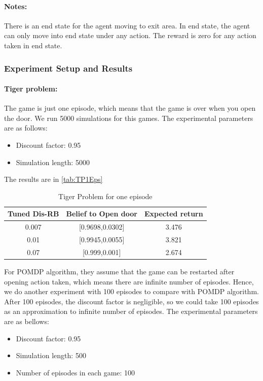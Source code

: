 \documentclass{article}
\begin{document}
\paragraph{Notes:} There is an end state for the agent moving to exit area. In 
end state, the agent can only move into end state under any action. The reward is
zero for any action taken in end state.

\subsubsection{Experiment Setup and Results}

\paragraph{Tiger problem:} The game is just one episode, which means that the game is over
when you open the door. We run 5000 simulations for this games. The experimental parameters
are as follows:
\begin{itemize}
\item Discount factor: 0.95
\item Simulation length: 5000
\end{itemize}

The results are in \autoref{tab:TP1Eps}

\begin{table}[H] 
\begin{center}
	\begin{tabular} {| c | c | c |}
	\hline \hline
	Tuned Dis-RB & Belief to Open door & Expected return \\
	\hline
	0.007 & [0.9698,0.0302] & 3.476 \\
	\hline
	0.01 & [0.9945,0.0055] & 3.821 \\
	\hline
	0.07 & [0.999,0.001] & 2.674 \\
	\hline \hline
	\end{tabular}
\end{center}
\caption{Tiger Problem for one episode}
\label{tab:TP1Eps}
\end{table}

For POMDP algorithm, they assume that the game can be restarted after opening action taken, 
which means there are infinite number of episodes. Hence, we do another experiment with 
100 episodes to compare with POMDP algorithm. After 100 episodes, the discount factor is
negligible, so we could take 100 episodes as an approximation to infinite number of episodes.
The experimental parameters are as bellows:
\begin{itemize}
\item Discount factor: 0.95
\item Simulation length: 500
\item Number of episodes in each game: 100
\end{itemize}
\end{document}
